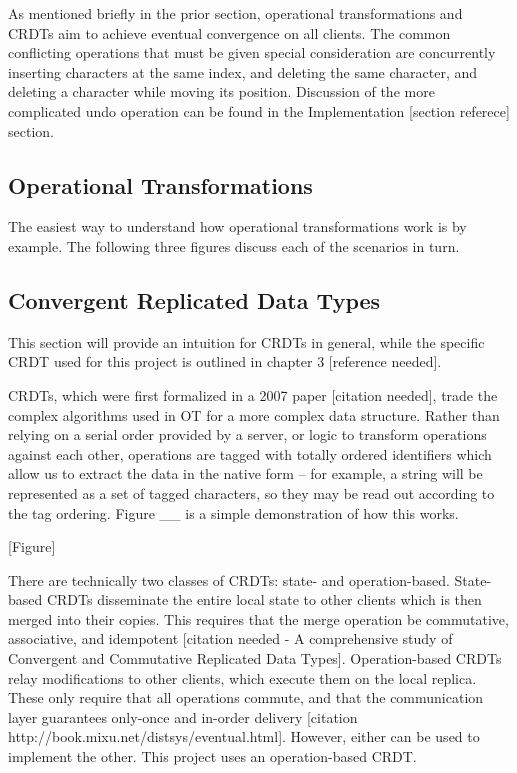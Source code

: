 \documentclass[12pt,a4paper,twoside,openright]{report}
\begin{document}
	As mentioned briefly in the prior section, operational transformations and CRDTs aim to achieve eventual convergence on all clients. The common conflicting operations that must be given special consideration are concurrently inserting characters at the same index, and deleting the same character, and deleting a character while moving its position. Discussion of the more complicated undo operation can be found in the Implementation [section referece] section.

	\subsection{Operational Transformations}
	
	The easiest way to understand how operational transformations work is by example. The following three figures discuss each of the scenarios in turn.
	
		
	\subsection{Convergent Replicated Data Types}
	
	This section will provide an intuition for CRDTs in general, while the specific CRDT used for this project is outlined in chapter 3 [reference needed].

	CRDTs, which were first formalized in a 2007 paper [citation needed], trade the complex algorithms used in OT for a more complex data structure. Rather than relying on a serial order provided by a server, or logic to transform operations against each other, operations are tagged with totally ordered identifiers which allow us to extract the data in the native form – for example, a string will be represented as a set of tagged characters, so they may be read out according to the tag ordering. Figure __ is a simple demonstration of how this works. 
	
	[Figure]
	
	There are technically two classes of CRDTs: state- and operation-based. State-based CRDTs disseminate the entire local state to other clients which is then merged into their copies. This requires that the merge operation be commutative, associative, and idempotent [citation needed - A comprehensive study of Convergent and Commutative Replicated Data Types]. Operation-based CRDTs relay modifications to other clients, which execute them on the local replica. These only require that all operations commute, and that the communication layer guarantees only-once and in-order delivery [citation http://book.mixu.net/distsys/eventual.html]. However, either can be used to implement the other. This project uses an operation-based CRDT. 
	
\end{document}
